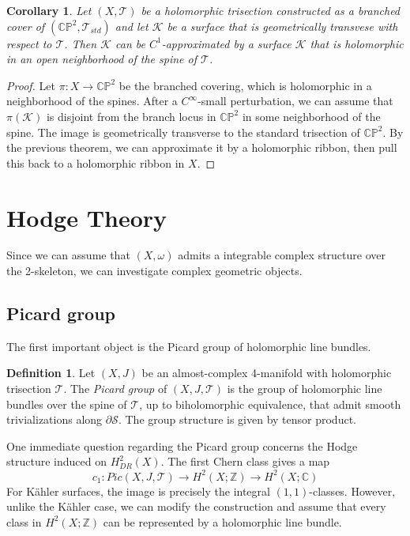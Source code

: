 \documentclass[11pt]{amsart}
\newtheorem{corollary}[theorem]{Corollary}
\theoremstyle{definition}
\newtheorem{definition}[theorem]{Definition}
\theoremstyle{remark}
\numberwithin{equation}{section}
\newcommand{\ZZ}{\mathbb{Z}}
\newcommand{\cT}{\mathcal{T}}
\newcommand{\cK}{\mathcal{K}}
\newcommand{\cS}{\mathcal{S}}
\newcommand{\CC}{\mathbb{C}}
\newcommand{\CP}{\mathbb{CP}}
\begin{document}
\begin{corollary}
\label{cor:hol-ribbon}
    Let $(X,\cT)$ be a holomorphic trisection constructed as a branched cover of $(\CP^2,\cT_{std})$ and let $\cK$ be a surface that is geometrically transvese with respect to $\cT$.  Then $\cK$ can be $C^1$-approximated by a surface $\cK$ that is holomorphic in an open neighborhood of the spine of $\cT$.
\end{corollary}

\begin{proof}
    Let $\pi:X \rightarrow \CP^2$ be the branched covering, which is holomorphic in a neighborhood of the spines.  After a $C^{\infty}$-small perturbation, we can assume that $\pi(\cK)$ is disjoint from the branch locus in $\CP^2$ in some neighborhood of the spine.  The image is geometrically transverse to the standard trisection of $\CP^2$.  By the previous theorem, we can approximate it by a holomorphic ribbon, then pull this back to a holomorphic ribbon in $X$. 
\end{proof}



\section{Hodge Theory}

Since we can assume that $(X,\omega)$ admits a integrable complex structure over the 2-skeleton, we can investigate complex geometric objects.

\subsection{Picard group}

The first important object is the Picard group of holomorphic line bundles.

\begin{definition}
\label{def:Picard}
    Let $(X,J)$ be an almost-complex 4-manifold with holomorphic trisection $\cT$.  The {\it Picard group} of $(X,J,\cT)$ is the group of holomorphic line bundles over the spine of $\cT$, up to biholomorphic equivalence, that admit smooth trivializations along $\partial \cS$.  The group structure is given by tensor product.
\end{definition}

One immediate question regarding the Picard group concerns the Hodge structure induced on $H^2_{DR}(X)$.  The first Chern class gives a map
\[c_1: Pic(X,J,\cT) \rightarrow  H^2(X;\ZZ) \rightarrow H^2(X;\CC)\] 
For K\"ahler surfaces, the image is precisely the integral $(1,1)$-classes.  However, unlike the K\"ahler case, we can modify the construction and assume that every class in $H^2(X;\ZZ)$ can be represented by a holomorphic line bundle.
\end{document}
